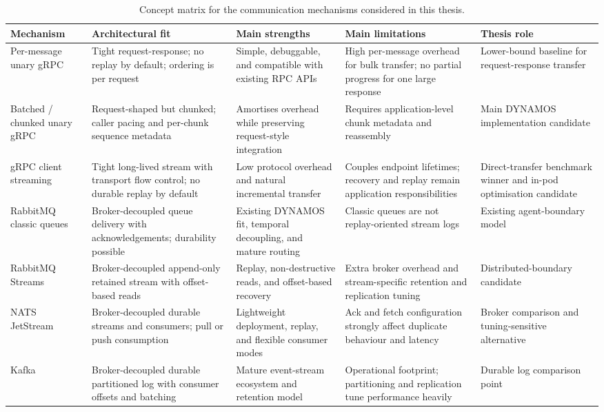 \begin{table}[!htbp]
    \centering
    \footnotesize
    \caption{Concept matrix for the communication mechanisms considered in this thesis.}
    \label{tab:concept-matrix}
    \setlength{\tabcolsep}{4pt}
    \renewcommand{\arraystretch}{1.06}
    \begin{tabularx}{\textwidth}{>{\raggedright\arraybackslash}p{}>{\raggedright\arraybackslash}X>{\raggedright\arraybackslash}X>{\raggedright\arraybackslash}X>{\raggedright\arraybackslash}p{}}
        \toprule
        Mechanism & Architectural fit & Main strengths & Main limitations & Thesis role \\
        \midrule
        Per-message unary gRPC & Tight request-response; no replay by default; ordering is per request & Simple, debuggable, and compatible with existing RPC APIs & High per-message overhead for bulk transfer; no partial progress for one large response & Lower-bound baseline for request-response transfer \\
        Batched / chunked unary gRPC & Request-shaped but chunked; caller pacing and per-chunk sequence metadata & Amortises overhead while preserving request-style integration & Requires application-level chunk metadata and reassembly & Main DYNAMOS implementation candidate \\
        gRPC client streaming & Tight long-lived stream with transport flow control; no durable replay by default & Low protocol overhead and natural incremental transfer & Couples endpoint lifetimes; recovery and replay remain application responsibilities & Direct-transfer benchmark winner and in-pod optimisation candidate \\
        RabbitMQ classic queues & Broker-decoupled queue delivery with acknowledgements; durability possible & Existing DYNAMOS fit, temporal decoupling, and mature routing & Classic queues are not replay-oriented stream logs & Existing agent-boundary model \\
        RabbitMQ Streams & Broker-decoupled append-only retained stream with offset-based reads & Replay, non-destructive reads, and offset-based recovery & Extra broker overhead and stream-specific retention and replication tuning & Distributed-boundary candidate \\
        NATS JetStream & Broker-decoupled durable streams and consumers; pull or push consumption & Lightweight deployment, replay, and flexible consumer modes & Ack and fetch configuration strongly affect duplicate behaviour and latency & Broker comparison and tuning-sensitive alternative \\
        Kafka & Broker-decoupled durable partitioned log with consumer offsets and batching & Mature event-stream ecosystem and retention model & Operational footprint; partitioning and replication tune performance heavily & Durable log comparison point \\
        \bottomrule
    \end{tabularx}
\end{table}


